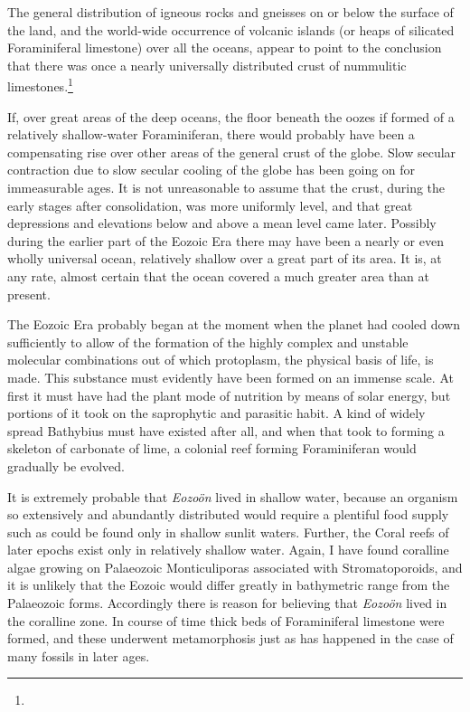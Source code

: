 \documentclass[a4paper, 12pt, oneside]{article}
\begin{document}
The general distribution of igneous rocks and gneisses on or below the surface of the land, and the world-wide occurrence of volcanic islands (or heaps of silicated Foraminiferal limestone) over all the oceans, appear to point to the conclusion that there was once a nearly universally distributed crust of nummulitic limestones.\footnote{}

If, over great areas of the deep oceans, the floor beneath the oozes if formed of a relatively shallow-water Foraminiferan, there would probably have been a compensating rise over other areas of the general crust of the globe. Slow secular contraction due to slow secular cooling of the globe has been going on for immeasurable ages. It is not unreasonable to assume that the crust, during the early stages after consolidation, was more uniformly level, and that great depressions and elevations below and above a mean level came later. Possibly during the earlier part of the Eozoic Era there may have been a nearly or even wholly universal ocean, relatively shallow over a great part of its area. It is, at any rate, almost certain that the ocean covered a much greater area than at present.

The Eozoic Era probably began at the moment when the planet had cooled down sufficiently to allow of the formation of the highly complex and unstable molecular combinations out of which protoplasm, the physical basis of life, is made. This substance must evidently have been formed on an immense scale. At first it must have had the plant mode of nutrition by means of solar energy, but portions of it took on the saprophytic and parasitic habit. A kind of widely spread Bathybius must have existed after all, and when that took to forming a skeleton of carbonate of lime, a colonial reef forming Foraminiferan would gradually be evolved.

It is extremely probable that \emph{Eozoön} lived in shallow water, because an organism so extensively and abundantly distributed would require a plentiful food supply such as could be found only in shallow sunlit waters. Further, the Coral reefs of later epochs exist only in relatively shallow water. Again, I have found coralline algae growing on Palaeozoic Monticuliporas associated with Stromatoporoids, and it is unlikely that the Eozoic would differ greatly in bathymetric range from the Palaeozoic forms. Accordingly there is reason for believing that \emph{Eozoön} lived in the coralline zone. In course of time thick beds of Foraminiferal limestone were formed, and these underwent metamorphosis just as has happened in the case of many fossils in later ages.
\end{document}
